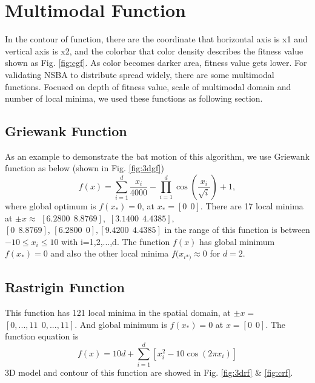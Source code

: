 \documentclass{ies2018}
\begin{document}
\section{Multimodal Function}
 In the contour of function, there are the coordinate that horizontal axis is x1 and vertical axis is x2, and the colorbar that color density describes the fitness value shown as Fig. \ref{fig:cgf}. As color becomes darker area, fitness value gets lower. For validating NSBA to distribute spread widely, there are some multimodal functions. Focused on depth of fitness value, scale of multimodal domain and number of local minima, we used these functions as following section.  
\subsection{Griewank Function}
As an example to demonstrate the bat motion of this algorithm, we use Griewank function as below (shown in Fig. \ref{fig:3dgf})
\begin{equation}
f(x)= \sum_{i=1}^d \frac{x_{i}}{4000} - \prod_{i=1}^d \cos(\frac{x_i}{\sqrt{i}}) + 1,
\end{equation}
where global optimum is ${f(x_*)}=0$, at $x_* = {[0 \ \ 0]}$. There are 17 local minima at ${\pm x \approx}$ ${ [6.2800 \ \ 8.8769],}$ ${[3.1400 \ \ 4.4385],}$ \\ ${[0 \ \ 8.8769]}$, ${[6.2800 \ \ 0], [9.4200 \ \ 4.4385]}$ in the range of this function is between ${-10 \leq x_i \leq 10}$ with i=1,2,...,d. The function ${f(x)}$ has global minimum ${f(x_*)}=0$ and also the other local minima ${f(x_{i*)} \approx 0}$  for ${d=2}$.  

 \subsection{Rastrigin Function}
 This function has 121 local minima in the spatial domain, at ${ \pm x=}$ ${[0,...,11 \ \ 0,...,11]}$. And global minimum is ${f(x_*)=0}$ at ${x=[0 \ \ 0]}$. The function equation is
 \begin{equation}
f(x)= 10d+\sum_{i=1}^d [x_i^2-10 \cos(2\pi x_i)]
\end{equation}
3D model and contour of this function are showed in Fig. \ref{fig:3drf} \& \ref{fig:crf}. 
\end{document}
